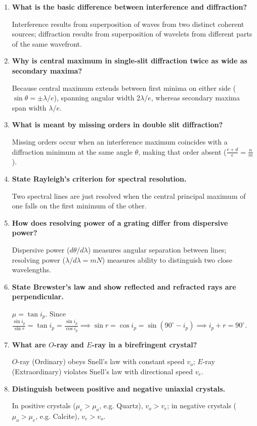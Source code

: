 \documentclass[12pt,a4paper]{article}
\newcommand{\Q}[1]{\textbf{#1}\par\noindent\ignorespaces}
\begin{document}
\begin{tcolorbox}[exambox, title={\textbf{Frequently Asked / Viva Questions}}]
\begin{enumerate}[topsep=0pt, label=\textbf{Q\arabic*.}, itemsep=5pt]
  \item \Q{What is the basic difference between interference and diffraction?}
  Interference results from superposition of waves from two distinct coherent sources; diffraction results from superposition of wavelets from different parts of the same wavefront.

  \item \Q{Why is central maximum in single-slit diffraction twice as wide as secondary maxima?}
  Because central maximum extends between first minima on either side ($\sin\theta = \pm \lambda/e$), spanning angular width $2\lambda/e$, whereas secondary maxima span width $\lambda/e$.

  \item \Q{What is meant by missing orders in double slit diffraction?}
  Missing orders occur when an interference maximum coincides with a diffraction minimum at the same angle $\theta$, making that order absent ($\frac{e+d}{e} = \frac{n}{m}$).

  \item \Q{State Rayleigh's criterion for spectral resolution.}
  Two spectral lines are just resolved when the central principal maximum of one falls on the first minimum of the other.

  \item \Q{How does resolving power of a grating differ from dispersive power?}
  Dispersive power ($d\theta/d\lambda$) measures angular separation between lines; resolving power ($\lambda/d\lambda = mN$) measures ability to distinguish two close wavelengths.

  \item \Q{State Brewster's law and show reflected and refracted rays are perpendicular.}
  $\mu = \tan i_p$. Since $\frac{\sin i_p}{\sin r} = \tan i_p = \frac{\sin i_p}{\cos i_p} \implies \sin r = \cos i_p = \sin(90^\circ - i_p) \implies i_p + r = 90^\circ$.

  \item \Q{What are $O$-ray and $E$-ray in a birefringent crystal?}
  $O$-ray (Ordinary) obeys Snell's law with constant speed $v_o$; $E$-ray (Extraordinary) violates Snell's law with directional speed $v_e$.

  \item \Q{Distinguish between positive and negative uniaxial crystals.}
  In positive crystals ($\mu_e > \mu_o$, e.g. Quartz), $v_o > v_e$; in negative crystals ($\mu_o > \mu_e$, e.g. Calcite), $v_e > v_o$.


\end{enumerate}
\end{tcolorbox}
\end{document}
